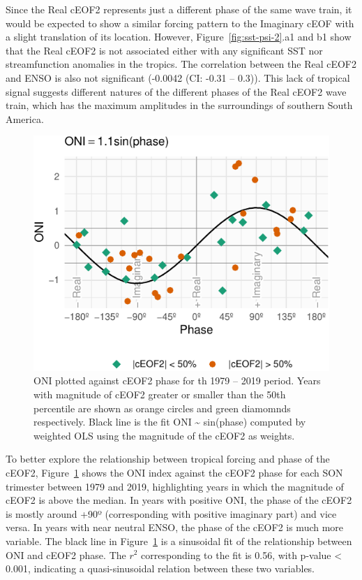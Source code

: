 \documentclass[smallextended]{svjour3}       %
\begin{document}
Since the Real cEOF2 represents just a different phase of the same wave train, it would be expected to show a similar forcing pattern to the Imaginary cEOF with a slight translation of its location.
However, Figure~\ref{fig:sst-psi-2}.a1 and b1 show that the Real cEOF2 is not associated either with any significant SST nor streamfunction anomalies in the tropics.
The correlation between the Real cEOF2 and ENSO is also not significant (-0.0042 (CI: -0.31 -- 0.3)).
This lack of tropical signal suggests different natures of the different phases of the Real cEOF2 wave train, which has the maximum amplitudes in the surroundings of southern South America.

\begin{figure}
\centering
\includegraphics{../figures/enso-phase-1.pdf}
\caption{\label{fig:enso-phase} ONI plotted against cEOF2 phase for th 1979 -- 2019 period. Years with magnitude of cEOF2 greater or smaller than the 50th percentile are shown as orange circles and green diamomnds respectively. Black line is the fit ONI \textasciitilde{} sin(phase) computed by weighted OLS using the magnitude of the cEOF2 as weights.}
\end{figure}

To better explore the relationship between tropical forcing and phase of the cEOF2, Figure~\ref{fig:enso-phase} shows the ONI index against the cEOF2 phase for each SON trimester between 1979 and 2019, highlighting years in which the magnitude of cEOF2 is above the median.
In years with positive ONI, the phase of the cEOF2 is mostly around +90º (corresponding with positive imaginary part) and vice versa.
In years with near neutral ENSO, the phase of the cEOF2 is much more variable.
The black line in Figure~\ref{fig:enso-phase} is a sinusoidal fit of the relationship between ONI and cEOF2 phase.
The \(r^2\) corresponding to the fit is 0.56, with p-value \textless{} 0.001, indicating a quasi-sinusoidal relation between these two variables.
\end{document}
